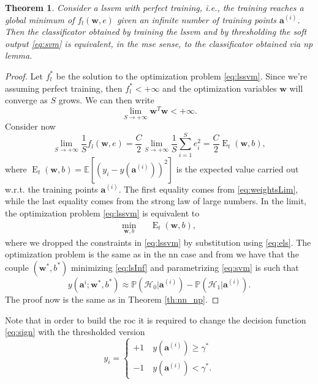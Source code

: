 \documentclass[draftcls,onecolumn,12pt]{IEEEtran}
\newcommand{\ie}{i.e., }
\newcommand{\wrt}{w.r.t. }
\newcommand{\Exp}[1]{\mathbb{E}\left[#1\right]}
\DeclareMathOperator{\E}{E}
\newtheorem{theorem}{Theorem}
\begin{document}
\begin{theorem}
\label{th:lsnp}
Consider a \ac{lssvm} with perfect training, \ie the training reaches a global minimum of $f_l(\mathbf{w},e)$ given an infinite number of training points $\bm{a}^{(i)}$. Then the classificator obtained by training the \ac{lssvm} and by thresholding the soft output \eqref{eq:svm} is equivalent, in the \ac{mse} sense, to the classificator obtained via \ac{np} lemma.
\end{theorem}
\begin{proof}
Let $f_l^*$ be the solution to the optimization problem \eqref{eq:lssvm}. Since we're assuming perfect training, then $f_l^* < +\infty$ and the optimization variables $\mathbf{w}$ will converge as $S$ grows. We can then write
\begin{equation}
\label{eq:weightsLim}
			\lim_{S \to +\infty} \mathbf{w}^T \mathbf{w} < +\infty.	
\end{equation}
Consider now
\begin{equation}
	\lim_{S \to +\infty} \frac{1}{S} f_l(\mathbf{w},e) =\frac{C}{2} \lim_{S \to +\infty}\frac{1}{S}  \sum_{i=1}^S e^2_i	=\frac{C}{2}\E_t(\mathbf{w},b),
\end{equation}
where $\E_t(\mathbf{w},b) = \Exp{\left(y_i - y(\mathbf{a}^{(i)})\right)^2} $ is the expected value carried out \wrt the training points $\mathbf{a}^{(i)}$. 
The first equality comes from \eqref{eq:weightsLim}, while the last equality comes from the strong law of large numbers. In the limit, the optimization problem \eqref{eq:lssvm} is equivalent to
\begin{equation}
\label{eq:lsInf}
	\begin{aligned}
	& \underset{\mathbf{w},b}{\text{min}} & &  \E_t(\mathbf{w},b), & 
	\end{aligned}	
\end{equation}
where we dropped the constraints in \eqref{eq:lssvm} by substitution using \eqref{eq:els}. The optimization problem is the same as in the \ac{nn} case and from \cite{Ruck-90} we have that the couple $(\mathbf{w}^*,b^*)$ minimizing \eqref{eq:lsInf} and parametrizing \eqref{eq:svm} is such that
\begin{equation}
	 y(\mathbf{a}^i;\mathbf{w}^*,b^*)  \approx \mathbb{P}(\mathcal{H}_0|\mathbf{a}^{(i)}) - \mathbb{P}(\mathcal{H}_1|\mathbf{a}^{(i)}).
\end{equation}
The proof now is the same as in Theorem \ref{th:nn_np}.
\end{proof}
Note that in order to build the \ac{roc} it is required to change the decision function \eqref{eq:sign} with the thresholded version
\begin{equation}
y_i = 
\begin{cases}
 +1 \quad y(\mathbf{a}^{(i)})  \geq \gamma^* \\
 -1 \quad y(\mathbf{a}^{(i)})  < \gamma^*.
\end{cases}		
\end{equation}
\end{document}
